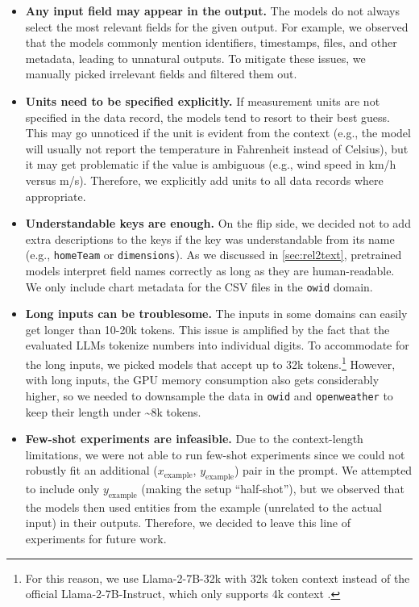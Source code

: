 \begin{itemize}


    \item\textbf{Any input field may appear in the output.} The models do not always select the most relevant fields for the given output. For example, we observed that the models commonly mention identifiers, timestamps, files, and other metadata, leading to unnatural outputs. To mitigate these issues, we manually picked irrelevant fields and filtered them out.

    \item\textbf{Units need to be specified explicitly.} If measurement units are not specified in the data record, the models tend to resort to their best guess. This may go unnoticed if the unit is evident from the context (e.g., the model will usually not report the temperature in Fahrenheit instead of Celsius), but it may get problematic if the value is ambiguous (e.g., wind speed in km/h versus m/s). Therefore, we explicitly add units to all data records where appropriate.

    \item\textbf{Understandable keys are enough.} On the flip side, we decided not to add extra descriptions to the keys if the key was understandable from its name (e.g., \texttt{homeTeam} or \texttt{dimensions}). As we discussed in \autoref{sec:rel2text}, pretrained models interpret field names correctly as long as they are human-readable. We only include chart metadata for the CSV files in the \texttt{owid} domain.

    \item\textbf{Long inputs can be troublesome.} The inputs in some domains can easily get longer than 10-20k tokens. This issue is amplified by the fact that the evaluated LLMs tokenize numbers into individual digits. To accommodate for the long inputs, we picked models that accept up to 32k tokens.\footnote{For this reason, we use Llama-2-7B-32k with 32k token context \cite{llama-2-7b-32k} instead of the official Llama-2-7B-Instruct, which only supports 4k context \cite{touvronLlamaOpenFoundation2023}.} However, with long inputs, the GPU memory consumption also gets considerably higher, so we needed to downsample the data in \texttt{owid} and \texttt{openweather} to keep their length under \textasciitilde 8k tokens.


    \item\textbf{Few-shot experiments are infeasible.} Due to the context-length limitations, we were not able to run few-shot experiments since we could not robustly fit an additional ($x_\text{example}$, $y_\text{example}$) pair in the prompt. We attempted to include only $y_\text{example}$ (making the setup ``half-shot''), but we observed that the models then used entities from the example (unrelated to the actual input) in their outputs. Therefore, we decided to leave this line of experiments for future work.


\end{itemize}
